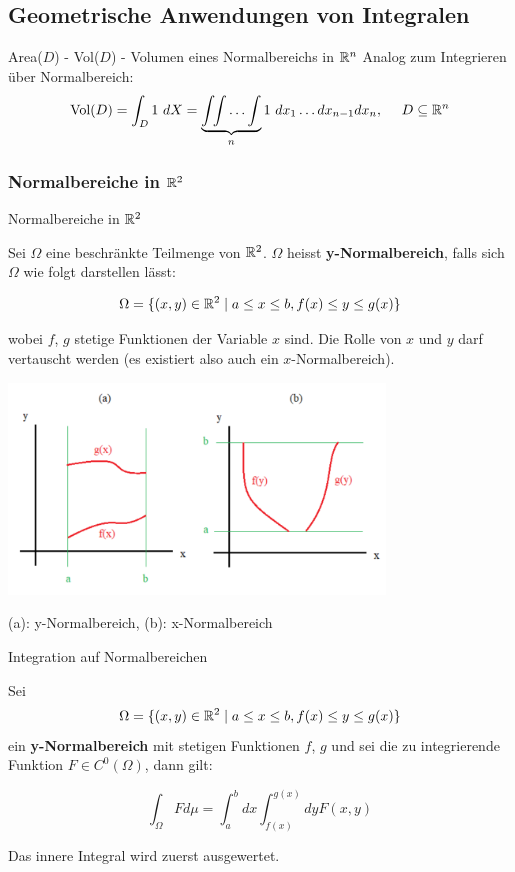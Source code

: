 
\subsection{Geometrische Anwendungen von Integralen}

\begin{Rezept}{Area($D$) - Vol($D$) - Volumen eines Normalbereichs in $\mathbb{R}^n$}{}
Analog zum Integrieren über Normalbereich:
\[ \text{Vol}(D) = \int_D 1 ~ dX = \underbrace{\int \!\! \int \ldots \int}_{n} 1 ~ dx_1 \ldots dx_{n-1} dx_n,  ~~~~ D \subseteq \mathbb{R}^n\]
\end{Rezept}

\subsubsection{Normalbereiche in $\mathbb{R}^2$}

\begin{Definition}{Normalbereiche in $\mathbb{R}^2$}{}

Sei $\Omega$ eine beschränkte Teilmenge von $\mathbb{R}^2$. $\Omega$ heisst \textbf{y-Normalbereich}, falls sich $\Omega$ wie folgt darstellen lässt:

\[
    \Omega = \{(x, y) \in \mathbb{R}^2 \mid a \leq x \leq b, f(x) \leq y \leq g(x)\}
\]

wobei $f$, $g$ stetige Funktionen der Variable $x$ sind. Die Rolle von $x$ und $y$ darf vertauscht werden (es existiert also auch ein $x$-Normalbereich).

\includegraphics[width=10cm]{images/normalbereich}

(a): y-Normalbereich, (b): x-Normalbereich

\end{Definition}
\begin{Satz}{Integration auf Normalbereichen}{}

Sei \[\Omega = \{(x, y) \in \mathbb{R}^2 \mid a \leq x \leq b, f(x) \leq y \leq g(x)\}\] ein \textbf{y-Normalbereich} mit stetigen Funktionen $f$, $g$ und sei die zu integrierende Funktion $F \in C^0(\Omega)$, dann gilt:

\[
    \int_{\Omega} F d\mu = \int_a^b dx \int_{f(x)}^{g(x)} dy F(x, y)
\]

Das innere Integral wird zuerst ausgewertet.
\end{Satz}

